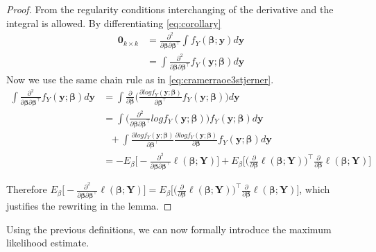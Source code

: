 \begin{proof}
From the regularity conditions interchanging of the derivative and the integral is allowed. By differentiating \eqref{eq:corollary}
\begin{align}
\textbf{0}_{k \times k} &= \frac{\partial^2}{\partial \boldsymbol{\beta} \partial \boldsymbol{\beta}^\top} \int f_Y(\boldsymbol{\beta};\textbf{y})d\textbf{y} \\
&=\int \frac{\partial^2}{\partial \boldsymbol{\beta} \partial \boldsymbol{\beta}^\top}f_Y(\textbf{y};\boldsymbol{\beta}) d\textbf{y}
\end{align}
Now we use the same chain rule as in \eqref{eq:cramerraoe3stjerner}.
\begin{align}
\int \frac{\partial^2}{\partial \boldsymbol{\beta} \partial \boldsymbol{\beta}^\top}f_Y(\textbf{y};\boldsymbol{\beta}) d\textbf{y} &= \int \frac{\partial}{\partial \boldsymbol{\beta}} \bigg( \frac{\partial log f_Y(\textbf{y};\boldsymbol{\beta})}{\partial \boldsymbol{\beta}^\top} f_Y(\textbf{y};\boldsymbol{\beta}) \bigg)d\textbf{y} \\
&= \int \bigg( \frac{\partial^2}{\partial \boldsymbol{\beta} \partial \boldsymbol{\beta}^\top } log f_Y(\textbf{y};\boldsymbol{\beta})  \bigg) f_Y(\textbf{y};\boldsymbol{\beta}) d\textbf{y} \\
& \ \ \ + \int \frac{\partial log f_Y(\textbf{y};\boldsymbol{\beta})}{\partial \boldsymbol{\beta}^\top} \frac{\partial log f_Y(\textbf{y};\boldsymbol{\beta})}{\partial \boldsymbol{\beta}} f_Y(\textbf{y};\boldsymbol{\beta}) d\textbf{y} \\
& =  -E_{\beta}\bigg[-\frac{\partial^2}{\partial \boldsymbol{\beta} \partial \boldsymbol{\beta}^\top} \ell(\boldsymbol{\beta};\textbf{Y}) \bigg]+  E_{\beta}\bigg[\bigg( \frac{\partial}{\partial \boldsymbol{\beta}}\ell(\boldsymbol{\beta};\textbf{Y}) \bigg)^\top \frac{\partial}{\partial \boldsymbol{\beta}}\ell(\boldsymbol{\beta};\textbf{Y})  \bigg]
\end{align}

Therefore $E_{\beta}\bigg[-\frac{\partial^2}{\partial \boldsymbol{\beta} \partial \boldsymbol{\beta}^\top} \ell(\boldsymbol{\beta};\textbf{Y}) \bigg] = E_{\beta}\bigg[\bigg( \frac{\partial}{\partial \boldsymbol{\beta}}\ell(\boldsymbol{\beta};\textbf{Y}) \bigg)^\top \frac{\partial}{\partial \boldsymbol{\beta}}\ell(\boldsymbol{\beta};\textbf{Y})  \bigg]$, which justifies the rewriting in the lemma. 
\end{proof}

Using the previous definitions, we can now formally introduce the maximum likelihood estimate. 

